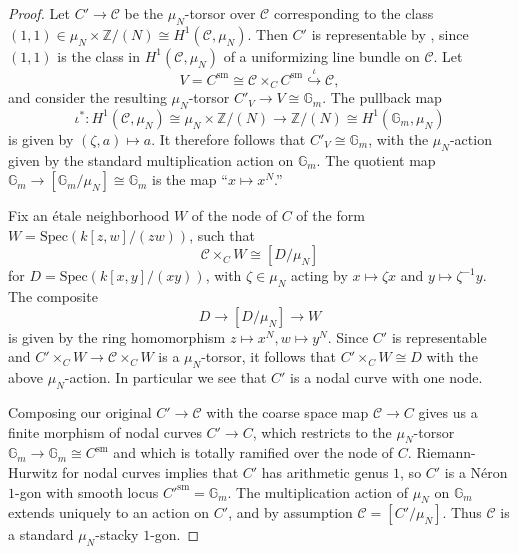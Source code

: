 \documentclass[11pt]{amsart}
\theoremstyle{definition}
\begin{document}
\begin{proof}
Let $C' \rightarrow {\mathcal{C}}$ be the $\mu_N$-torsor over ${\mathcal{C}}$ corresponding to the class $(1,1) \in \mu_N \times \mathbb{Z}/(N) \cong H^1 ({\mathcal{C}}, \mu_N)$. Then $C'$ is representable by \cite[2.3.10]{AH}, since $(1,1)$ is the class in $H^1 ({\mathcal{C}}, \mu_N)$ of a uniformizing line bundle on ${\mathcal{C}}$. Let 
\begin{displaymath}
V = C^{\mathrm{sm}} \cong {\mathcal{C}} \times_C C^{\mathrm{sm}} \stackrel{\iota}{\hookrightarrow} {\mathcal{C}}, 
\end{displaymath}
and consider the resulting $\mu_N$-torsor $C'_V \rightarrow V \cong \mathbb{G}_m$. The pullback map 
\begin{displaymath}
\iota^*: H^1({\mathcal{C}},\mu_N) \cong \mu_N \times \mathbb{Z}/(N) \rightarrow \mathbb{Z}/(N) \cong H^1(\mathbb{G}_m,\mu_N)
\end{displaymath}
is given by $(\zeta,a) \mapsto a$. It therefore follows that $C'_V \cong \mathbb{G}_m$, with the $\mu_N$-action given by the standard multiplication action on $\mathbb{G}_m$. The quotient map $\mathbb{G}_m \rightarrow [\mathbb{G}_m/\mu_N] \cong \mathbb{G}_m$ is the map ``$x\mapsto x^N$.''

Fix an \'etale neighborhood $W$ of the node of $C$ of the form $W = \mathrm{Spec}(k[z,w]/(zw))$, such that 
\begin{displaymath}
{\mathcal{C}} \times_C W \cong [D/\mu_N]
\end{displaymath}
for $D = \mathrm{Spec}(k[x,y]/(xy))$, with $\zeta \in \mu_N$ acting by $x \mapsto \zeta x$ and $y \mapsto \zeta^{-1} y$. The composite 
\begin{displaymath}
D \rightarrow [D/\mu_N] \rightarrow W
\end{displaymath}
is given by the ring homomorphism $z \mapsto x^N, w \mapsto y^N$. Since $C'$ is representable and $C' \times_C W \rightarrow {\mathcal{C}} \times_C W$ is a $\mu_N$-torsor, it follows that $C' \times_C W \cong D$ with the above $\mu_N$-action. In particular we see that $C'$ is a nodal curve with one node.

Composing our original $C' \rightarrow {\mathcal{C}}$ with the coarse space map ${\mathcal{C}} \rightarrow C$ gives us a finite morphism of nodal curves $C' \rightarrow C$, which restricts to the $\mu_N$-torsor $\mathbb{G}_m \rightarrow \mathbb{G}_m \cong C^{\mathrm{sm}}$ and which is totally ramified over the node of $C$. Riemann-Hurwitz for nodal curves implies that $C'$ has arithmetic genus $1$, so $C'$ is a N\'eron $1$-gon with smooth locus $C'^{\mathrm{sm}} = \mathbb{G}_m$. The multiplication action of $\mu_N$ on $\mathbb{G}_m$ extends uniquely to an action on $C'$, and by assumption ${\mathcal{C}} = [C'/\mu_N]$. Thus ${\mathcal{C}}$ is a standard $\mu_N$-stacky $1$-gon.
\end{proof}
\end{document}
